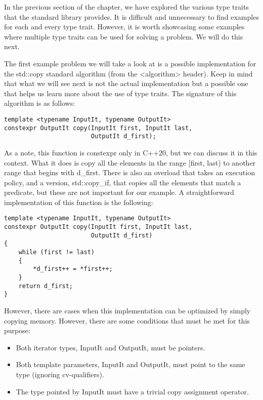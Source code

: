 
In the previous section of the chapter, we have explored the various type traits that the standard library provides. It is difficult and unnecessary to find examples for each and every type trait. However, it is worth showcasing some examples where multiple type traits can be used for solving a problem. We will do this next.


The first example problem we will take a look at is a possible implementation for the std::copy standard algorithm (from the <algorithm> header). Keep in mind that what we will see next is not the actual implementation but a possible one that helps us learn more about the use of type traits. The signature of this algorithm is as follows:

\begin{lstlisting}[style=styleCXX]
template <typename InputIt, typename OutputIt>
constexpr OutputIt copy(InputIt first, InputIt last,
						OutputIt d_first);
\end{lstlisting}

As a note, this function is constexpr only in C++20, but we can discuss it in this context. What it does is copy all the elements in the range [first, last) to another range that begins with d\_first. There is also an overload that takes an execution policy, and a version, std::copy\_if, that copies all the elements that match a predicate, but these are not important for our example. A straightforward implementation of this function is the following:

\begin{lstlisting}[style=styleCXX]
template <typename InputIt, typename OutputIt>
constexpr OutputIt copy(InputIt first, InputIt last,
						OutputIt d_first)
{
	while (first != last)
	{
		*d_first++ = *first++;
	}
	return d_first;
}
\end{lstlisting}

However, there are cases when this implementation can be optimized by simply copying memory. However, there are some conditions that must be met for this purpose:

\begin{itemize}
\item
Both iterator types, InputIt and OutputIt, must be pointers.

\item
Both template parameters, InputIt and OutputIt, must point to the same type (ignoring cv-qualifiers).

\item
The type pointed by InputIt must have a trivial copy assignment operator.
\end{itemize}

